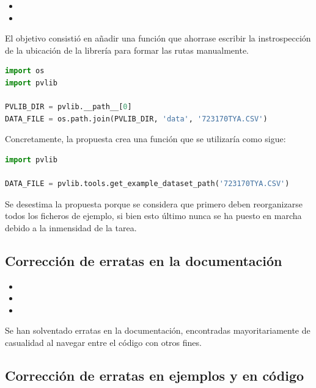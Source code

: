 \begin{itemize}
    \item {}
    \item {}
\end{itemize}

El objetivo consistió en añadir una función que ahorrase escribir la instrospección de la ubicación de la librería para formar las rutas manualmente.

\begin{lstlisting}[language=python, caption={Fragmento de código utilizado normalmente para obtener la ruta de los ficheros de la librería}, label={lst:example_files_current}]
import os
import pvlib

PVLIB_DIR = pvlib.__path__[0]
DATA_FILE = os.path.join(PVLIB_DIR, 'data', '723170TYA.CSV')
\end{lstlisting}

Concretamente, la propuesta crea una función que se utilizaría como sigue:

\begin{lstlisting}[language=python, caption={Fragmento de código utilizando la función propuesta para obtener la ruta de los ficheros de la librería}, label={lst:example_files_proposal}]
import pvlib

DATA_FILE = pvlib.tools.get_example_dataset_path('723170TYA.CSV')
\end{lstlisting}

Se desestima la propuesta porque se considera que primero deben reorganizarse todos los ficheros de ejemplo, si bien esto último nunca se ha puesto en marcha debido a la inmensidad de la tarea.

\subsection{Corrección de erratas en la documentación}

\begin{itemize}
    \item {}
    \item {}
    \item {}
\end{itemize}

Se han solventado erratas en la documentación, encontradas mayoritariamente de casualidad al navegar entre el código con otros fines.

\subsection{Corrección de erratas en ejemplos y en código}

